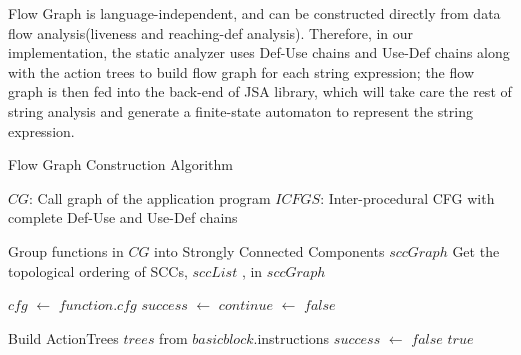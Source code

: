 Flow Graph is language-independent, and can be constructed directly from data flow analysis(liveness and reaching-def analysis). Therefore, in our implementation, the static analyzer uses Def-Use chains and Use-Def chains along with the action trees to build flow graph for each string expression; the flow graph is then fed into the back-end of JSA library, which will take care the rest of string analysis and generate a finite-state automaton to represent the string expression.

\begin{algorithm}
\caption{Flow Graph Construction Algorithm}
\begin{algorithmic}[1]
\Require 
  \State $CG$: Call graph of the application program
  \State $ICFGS$: Inter-procedural CFG with complete Def-Use and Use-Def chains

\State Group functions in $CG$ into Strongly Connected Components $sccGraph$
\State Get the topological ordering of SCCs, $sccList$ , in $sccGraph$

      \State $cfg$ $\gets$ $function.cfg$
        \State $success$ $\gets$ 
          \State $continue$ $\gets$ $false$
        \EndIf
      \EndFor
    \EndFor
  \EndFor
\EndUntil

\EndProcedure

\end{algorithmic}
\end{algorithm}


\begin{algorithm}
\begin{algorithmic}[1]
  \State Build ActionTrees $trees$ from $basicblock$.instructions
    \State $success$ $\gets$ 
      \State \Return $false$
    \EndIf
  \EndFor
  \State \Return $true$
\EndFunction
{}
\end{algorithmic}
\end{algorithm}


\algnewcommand{}
\algnewcommand{}

